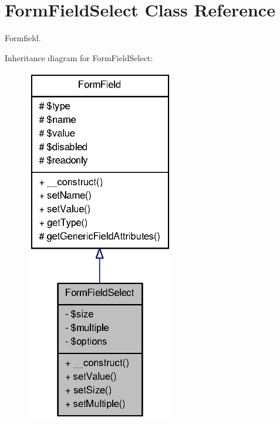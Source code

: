 \section{FormFieldSelect Class Reference}
\label{classFormFieldSelect}


Formfield.  




Inheritance diagram for FormFieldSelect:\nopagebreak
\begin{figure}[H]
\begin{center}
\leavevmode
\includegraphics[width=184pt]{classFormFieldSelect__inherit__graph}
\end{center}
\end{figure}


